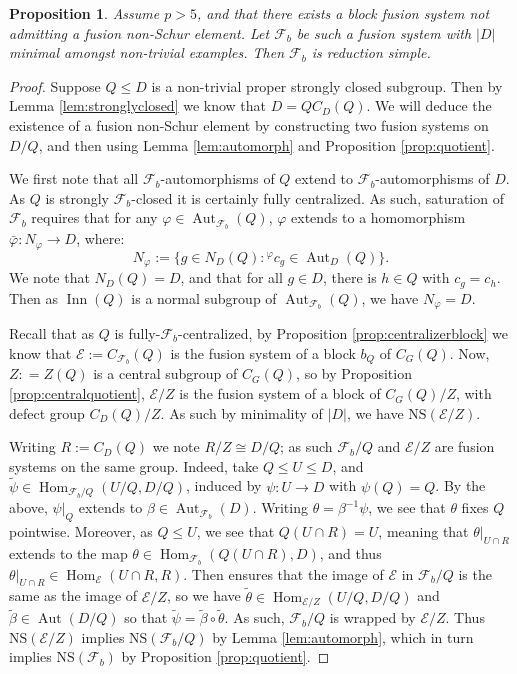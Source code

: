 \documentclass{amsart}
\theoremstyle{plain}\newtheorem{theorem}{Theorem}[section]
\theoremstyle{plain}\newtheorem{conjecture}[theorem]{Conjecture}
\theoremstyle{plain}\newtheorem{corollary}[theorem]{Corollary}
\theoremstyle{plain}\newtheorem{lemma}[theorem]{Lemma}
\theoremstyle{plain}\newtheorem{proposition}[theorem]{Proposition}
\theoremstyle{plain}\newtheorem{statement}[theorem]{}
\theoremstyle{definition}\newtheorem{definition}[theorem]{Definition}
\theoremstyle{definition}\newtheorem{example}[theorem]{Example}
\theoremstyle{definition}\newtheorem{examples}[theorem]{Examples}
\theoremstyle{definition}\newtheorem{notation}[theorem]{Notation}
\theoremstyle{definition}\newtheorem{remark}[theorem]{Remark}
\theoremstyle{definition}\newtheorem{remarks}[theorem]{Remarks}
\theoremstyle{definition}\newtheorem{question}[theorem]{Question}
\theoremstyle{definition}\newtheorem{propositiondefinition}[theorem]{Definition/Proposition}
\DeclareMathOperator{\Hom}{Hom}
\renewcommand{\phi}{\varphi}
\newcommand{\F}{\mathcal{F}}
\begin{document}
\begin{proposition}\label{prop:reductsimple} Assume $p>5$, and that there exists a block fusion system not admitting a fusion non-Schur element. Let $\mathcal{F}_b$ be such a fusion system with $|D|$ minimal amongst non-trivial examples. Then $\mathcal{F}_b$ is reduction simple.
\end{proposition}
\begin{proof}
    Suppose $Q \leq D$ is a non-trivial proper strongly closed subgroup. Then by Lemma \ref{lem:stronglyclosed} we know that $D=QC_D(Q)$. We will deduce the existence of a fusion non-Schur element by constructing two fusion systems on $D/Q$, and then using Lemma \ref{lem:automorph} and Proposition \ref{prop:quotient}. 
    
    We first note that all $\mathcal{F}_b$-automorphisms of $Q$ extend to $\mathcal{F}_b$-automorphisms of $D$. As $Q$ is strongly $\mathcal{F}_b$-closed it is certainly fully centralized. As such, saturation of $\mathcal{F}_b$ requires that for any $\phi \in \operatorname{Aut}_{\mathcal{F}_b}(Q)$, $\phi$ extends to a homomorphism $\bar\phi:N_\phi \rightarrow D$, where:
    $$N_\phi := \{g \in N_D(Q): \hspace{0pt}^\phi c_g \in \operatorname{Aut}_D(Q)\}.$$
    We note that $N_D(Q) =D$, and that for all $g \in D$, there is $h \in Q$ with $c_g = c_h$. Then as $\operatorname{Inn}(Q)$ is a normal subgroup of $\operatorname{Aut}_{\F_b}(Q)$, we have $N_\phi = D$.
    
   Recall that as $Q$ is fully-$\mathcal{F}_b$-centralized, by Proposition \ref{prop:centralizerblock} we know that $\mathcal{E}:=C_{\F_b}(Q)$ is the fusion system of a block $b_Q$ of $C_G(Q)$. Now, $Z: =Z(Q)$ is a central subgroup of $C_G(Q)$, so by Proposition \ref{prop:centralquotient}, $\mathcal{E}/Z$ is the fusion system of a block of $C_G(Q)/Z$, with defect group $C_D(Q)/Z$. As such by minimality of $|D|$, we have $\mathrm{NS}(\mathcal{E}/Z)$. 
   
   
   Writing $R := C_D(Q)$ we note $R/Z \cong D/Q$; as such $\mathcal{F}_b/Q$ and $\mathcal{E}/Z$ are fusion systems on the same group. Indeed, take $Q \leq U \leq D$, and $\tilde\psi \in \operatorname{Hom}_{\mathcal{F}_b/Q}(U/Q, D/Q)$, induced by $\psi: U \rightarrow D$ with $\psi(Q) = Q$. By the above, $\psi{\big|_Q}$ extends to $\beta \in \operatorname{Aut}_{\F_b}(D)$. Writing $\theta = \beta^{-1}\psi$, we see that $\theta$ fixes $Q$ pointwise. Moreover, as $Q \leq U$, we see that $Q(U \cap R) = U$, meaning that $\theta|_{U \cap R}$ extends to the map $\theta \in \Hom_{\F_b}(Q(U \cap R), D)$, and thus $\theta\big|_{U \cap R} \in \operatorname{Hom}_\mathcal{E}(U\cap R, R)$. Then \cite[Proposition 5.16]{Craven} ensures that the image of $\mathcal{E}$ in $\F_b/Q$ is the same as the image of $\mathcal{E}/Z$, so we have $\tilde\theta \in \operatorname{Hom}_{\mathcal{E}/Z}(U / Q, D/Q)$ and $\tilde\beta \in \operatorname{Aut}(D/Q)$ so that $\tilde\psi = \tilde\beta \circ \tilde\theta$. As such, $\mathcal{F}_b/Q$ is wrapped by $\mathcal{E}/Z$. Thus $\mathrm{NS}(\mathcal{E}/Z)$ implies $\mathrm{NS}(\mathcal{F}_b/Q)$ by Lemma \ref{lem:automorph}, which in turn implies $\mathrm{NS}(\F_b)$ by Proposition \ref{prop:quotient}.
\end{proof}
\end{document}
